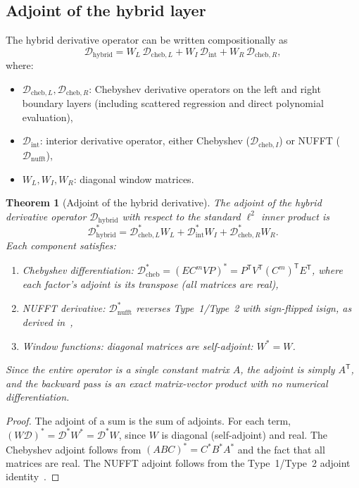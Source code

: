 \documentclass[sn-mathphys,Numbered]{sn-jnl}
\theoremstyle{thmstyleone}
\newtheorem{theorem}{Theorem}
\theoremstyle{thmstyletwo}
\theoremstyle{thmstylethree}
\newcommand{\T}{\mathsf{T}}
\newcommand{\calD}{\mathcal{D}}
\newcommand{\cheb}{\mathrm{cheb}}
\newcommand{\nufft}{\mathrm{nufft}}
\newcommand{\hybrid}{\mathrm{hybrid}}
\begin{document}
\subsection{Adjoint of the hybrid layer}\label{subsec:adjoint}

The hybrid derivative operator can be written compositionally as
\begin{equation}
    \calD_{\hybrid} = W_L \, \calD_{\cheb,L} + W_I \, \calD_{\mathrm{int}} + W_R \, \calD_{\cheb,R},
    \label{eq:hybrid_operator}
\end{equation}
where:
\begin{itemize}
    \item $\calD_{\cheb,L}, \calD_{\cheb,R}$: Chebyshev derivative operators on the left and right boundary layers (including scattered regression and direct polynomial evaluation),
    \item $\calD_{\mathrm{int}}$: interior derivative operator, either Chebyshev ($\calD_{\cheb,I}$) or NUFFT ($\calD_{\nufft}$),
    \item $W_L, W_I, W_R$: diagonal window matrices.
\end{itemize}

\begin{theorem}[Adjoint of the hybrid derivative]\label{thm:adjoint}
The adjoint of the hybrid derivative operator $\calD_{\hybrid}$ with respect to the standard $\ell^2$ inner product is
\begin{equation}
    \calD_{\hybrid}^* = \calD_{\cheb,L}^* W_L + \calD_{\mathrm{int}}^* W_I + \calD_{\cheb,R}^* W_R.
    \label{eq:hybrid_adjoint}
\end{equation}
Each component satisfies:
\begin{enumerate}
    \item Chebyshev differentiation: $\calD_{\cheb}^* = (E C^m V P)^* = P^\T V^\T (C^m)^\T E^\T$, where each factor's adjoint is its transpose (all matrices are real),
    \item NUFFT derivative: $\calD_{\nufft}^*$ reverses Type~1/Type~2 with sign-flipped isign, as derived in~\cite{wang2026differentiable},
    \item Window functions: diagonal matrices are self-adjoint: $W^* = W$.
\end{enumerate}
Since the entire operator is a single constant matrix $A$, the adjoint is simply $A^\T$, and the backward pass is an exact matrix-vector product with no numerical differentiation.
\end{theorem}
\begin{proof}
The adjoint of a sum is the sum of adjoints. For each term, $(W \calD)^* = \calD^* W^* = \calD^* W$, since $W$ is diagonal (self-adjoint) and real. The Chebyshev adjoint follows from $(ABC)^* = C^* B^* A^*$ and the fact that all matrices are real. The NUFFT adjoint follows from the Type~1/Type~2 adjoint identity~\cite[Theorem~1]{wang2026differentiable}.
\end{proof}
\end{document}
